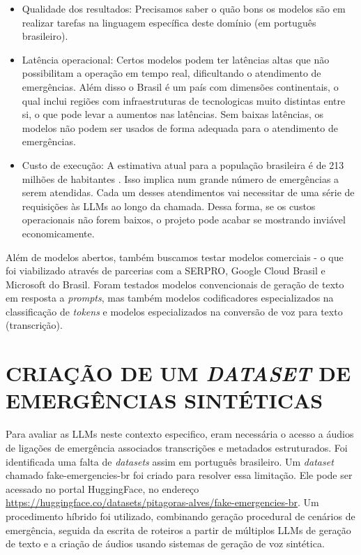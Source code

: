 \documentclass{IEEEphot}
\begin{document}
\begin{itemize}
    \item Qualidade dos resultados: Precisamos saber o quão bons os modelos são em realizar tarefas na linguagem específica deste domínio (em português brasileiro).
    \item Latência operacional: Certos modelos podem ter latências altas que não possibilitam a operação em tempo real, dificultando o atendimento de emergências. Além disso o Brasil é um país com dimensões continentais, o qual inclui regiões com infraestruturas de tecnologicas muito distintas entre si, o que pode levar a aumentos nas latências. Sem baixas latências, os modelos não podem ser usados de forma adequada para o atendimento de emergências.
    \item Custo de execução: A estimativa atual para a população brasileira é de 213 milhões de habitantes \cite{ibge2025estimativas}. Isso implica num grande número de emergências a serem atendidas. Cada um desses atendimentos vai necessitar de uma série de requisições às LLMs ao longo da chamada. Dessa forma, se os custos operacionais não forem baixos, o projeto pode acabar se mostrando inviável economicamente.
\end{itemize}

Além de modelos abertos, também buscamos testar modelos comerciais - o que foi viabilizado através de parcerias com a SERPRO, Google Cloud Brasil e Microsoft do Brasil. Foram testados modelos convencionais de geração de texto em resposta a \textit{prompts}, mas também modelos codificadores especializados na classificação de \textit{tokens} e modelos especializados na conversão de voz para texto (transcrição).

\section{CRIAÇÃO DE UM \textit{DATASET} DE EMERGÊNCIAS SINTÉTICAS}

Para avaliar as LLMs neste contexto especifico, eram necessária o acesso a áudios de ligações de emergência associados transcrições e metadados estruturados. Foi identificada uma falta de \textit{datasets} assim em português brasileiro. Um \textit{dataset} chamado fake-emergencies-br \cite{alves2026fake} foi criado para resolver essa limitação. Ele pode ser acessado no portal HuggingFace, no endereço \url{https://huggingface.co/datasets/pitagoras-alves/fake-emergencies-br}. Um procedimento híbrido foi utilizado, combinando geração procedural de cenários de emergência, seguida da escrita de roteiros a partir de múltiplos LLMs de geração de texto e a criação de áudios usando sistemas de geração de voz sintética.
\end{document}
